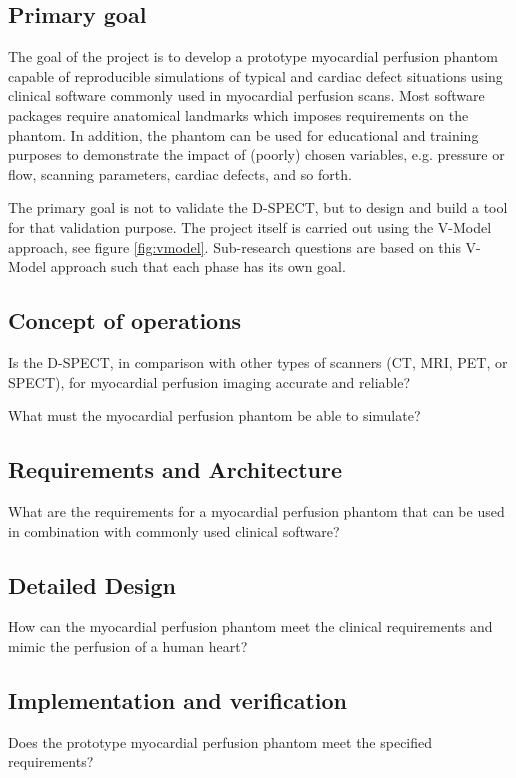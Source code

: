 \subsection{Primary goal}
The goal of the project is to develop a prototype myocardial perfusion phantom capable of reproducible simulations of typical and cardiac defect situations using clinical software commonly used in myocardial perfusion scans. Most software packages require anatomical landmarks which imposes requirements on the phantom. In addition, the phantom can be used for educational and training purposes to demonstrate the impact of (poorly) chosen variables, e.g. pressure or flow, scanning parameters, cardiac defects, and so forth.

The primary goal is not to validate the D-SPECT, but to design and build a tool for that validation purpose. The project itself is carried out using the V-Model \citep{rook1986controlling,osborne2005clarus} approach, see figure \ref{fig:vmodel}. Sub-research questions are based on this V-Model approach such that each phase has its own goal.

\subsection{Concept of operations}
Is the D-SPECT, in comparison with other types of scanners (CT, MRI, PET, or SPECT), for myocardial perfusion imaging accurate and reliable?

What must the myocardial perfusion phantom be able to simulate?

\subsection{Requirements and Architecture}
What are the requirements for a myocardial perfusion phantom that can be used in combination with commonly used clinical software?

\subsection{Detailed Design}
How can the myocardial perfusion phantom meet the clinical requirements and mimic the perfusion of a human heart?

\subsection{Implementation and verification}
Does the prototype myocardial perfusion phantom meet the specified requirements? 

